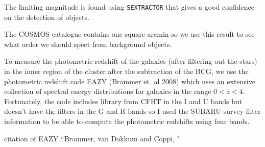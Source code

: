 The limiting magnitude is found using \texttt{SEXTRACTOR} that gives a good confidence on the detection of objects.

The COSMOS catalogue contains one square arcmin so we use this result to see what order  we should spect from background objects.

To measure the photometric redshift of the galaxies (after filtering out the stars) in the inner region of the cluster after the subtraction of the BCG, we use the photometric redshift code EAZY (Brammer et. al 2008) which uses an extensive collection of spectral energy distributions for galaxies in the range $0<z<4$. Fortunately, the code includes library from CFHT in the I and U bands but doesn't have the filters in the G and R bands so I used the SUBARU survey filter information to be able to compute the photometric redshifts using four bands.

citation of EAZY ``Brammer, van Dokkum and Coppi, \citeyear{Reference22}" 
